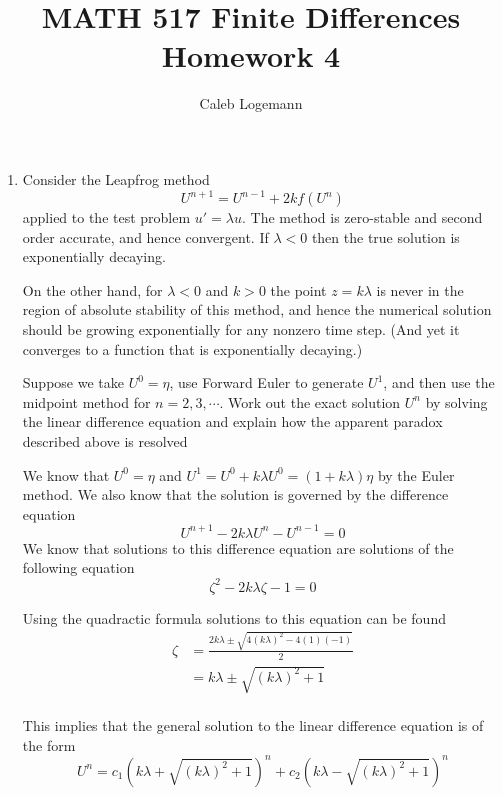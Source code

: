 \documentclass[11pt, oneside, titlepage]{article}
\title{MATH 517 Finite Differences Homework 4}
\author{Caleb Logemann}
\begin{document}
\maketitle

%
\begin{enumerate}
    \item %
        Consider the Leapfrog method
        \[
            U^{n+1} = U^{n−1} + 2k f(U^n)
        \]
        applied to the test problem $u′ = \lambda u$.
        The method is zero-stable and second order accurate, and hence convergent.
        If $\lambda < 0$ then the true solution is exponentially decaying.

        On the other hand, for $\lambda < 0$ and $k > 0$ the point $z = k\lambda$ is never in the
        region of absolute stability of this method,
        and hence the numerical solution should be growing exponentially for any
        nonzero time step.
        (And yet it converges to a function that is exponentially decaying.)

        Suppose we take $U^0 = \eta$, use Forward Euler to generate $U^1$, and
        then use the midpoint method for $n = 2, 3, \cdots$.
        Work out the exact solution $U^n$ by solving the linear difference
        equation and explain how the apparent paradox described above is resolved

        We know that $U^0 = \eta$ and
        $U^1 = U^0 + k \lambda U^0 = (1 + k\lambda)\eta$ by the Euler method.
        We also know that the solution is governed by the difference equation
        \[
            U^{n+1} - 2k\lambda U^n - U^{n-1} = 0
        \]
        We know that solutions to this difference equation are solutions of the
        following equation
        \[
            \zeta^2 - 2k\lambda \zeta - 1 = 0
        \]

        Using the quadractic formula solutions to this equation can be found
        \begin{align*}
            \zeta &= \frac{2k\lambda \pm \sqrt{4(k\lambda)^2 - 4(1)(-1)}}{2} \\
                  &= k\lambda \pm \sqrt{(k\lambda)^2 + 1} \\
        \end{align*}

        This implies that the general solution to the linear difference
        equation is of the form
        \[
            U^n = c_1(k\lambda + \sqrt{(k\lambda)^2 + 1})^n + c_2(k\lambda - \sqrt{(k\lambda)^2 + 1})^n
        \]


\end{enumerate}
\end{document}
